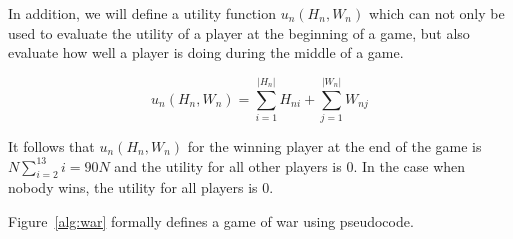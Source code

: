 \documentclass[conference]{IEEEtran}
\begin{document}
In addition, we will define a utility function $u_n(H_n, W_n)$ which can not only
be used to evaluate the utility of a player at the beginning of a game, but
also evaluate how well a player is doing during the middle of a game.

\begin{displaymath}
    u_n(H_n, W_n) = \sum_{i=1}^{|H_n|}{H_{ni}} + \sum_{j=1}^{|W_n|}{W_{nj}}
\end{displaymath}

It follows that $u_n(H_n, W_n)$ for the winning player at the end of the game
is $N\sum_{i=2}^{13}{i} = 90N$ and the utility for all other players is $0$. In
the case when nobody wins, the utility for all players is $0$.

Figure~\ref{alg:war} formally defines a game of war using pseudocode.
\end{document}
